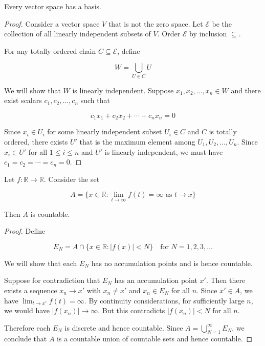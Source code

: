 \begin{exercise}
    Every vector space has a basis.
\end{exercise}

\begin{proof}
   Consider a vector space $V$ that is not the zero space. Let $\mathcal{E}$ be the collection of 
   all linearly independent subsets of $V$. Order $\mathcal{E}$ by inclusion $\subseteq$.
   
   For any totally ordered chain $C \subseteq \mathcal{E}$, define 

   \[
        W = \bigcup_{U \in C} U
   \]

   We will show that $W$ is linearly independent. Suppose $x_1, x_2, \ldots, x_n \in W$ and there exist scalars $c_1,c_2,\ldots, c_n$ such that

   \[
    c_1x_1 + c_2 x_2 + \cdots + c_n x_n = 0
   \]

    Since $x_i \in U_i$ for some linearly independent subset $U_i \in C$ and $C$ is totally ordered, there exists $U'$ that is the 
    maximum element among $U_1,U_2,\ldots ,U_n$. Since $x_i \in U'$ for all $1 \le i \le n$ 
    and $U'$ is linearly independent, we must have $c_1 = c_2 = \cdots = c_n = 0$.

\end{proof}

\begin{exercise}
    Let $f: \mathbb{R} \to \mathbb{R}$. Consider the set

    \[
        A = \{x \in \mathbb{R}: \lim_{t \to \infty} f(t) = \infty \text{ as } t \to x\}
    \]

    Then $A$ is countable.
\end{exercise}

\begin{proof}
    Define

    \[
        E_N = A \cap \{x \in \mathbb{R}: |f(x)| < N\} \quad \text{for } N = 1,2,3, \ldots
    \]

    We will show that each $E_N$ has no accumulation points and is hence countable.

    Suppose for contradiction that $E_N$ has an accumulation point $x'$. Then there exists a sequence $x_n \to x'$ with $x_n \ne x'$ and $x_n \in E_N$ for all $n$.
    Since $x' \in A$, we have $\lim_{t \to x'} f(t) = \infty$. By continuity considerations, for sufficiently large $n$, we would have $|f(x_n)| \to \infty$. 
    But this contradicts $|f(x_n)| < N$ for all $n$.

    Therefore each $E_N$ is discrete and hence countable. Since $A = \bigcup_{N=1}^{\infty} E_N$, 
    we conclude that $A$ is a countable union of countable sets and hence countable.

\end{proof}